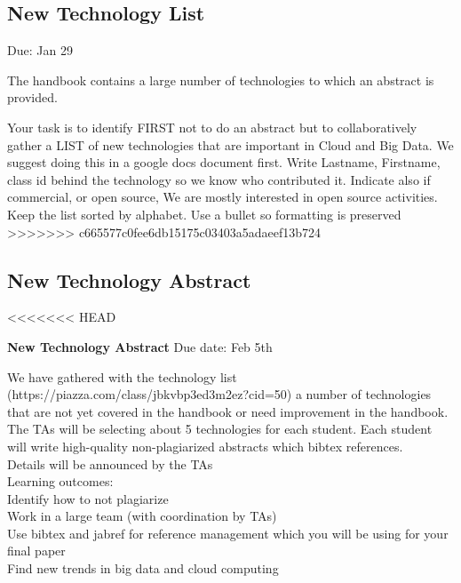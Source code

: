 \subsection{New Technology List}

\begin{exercise} \label{E:new-tech}
Due: Jan 29

The handbook contains a large number of technologies to which an
abstract is provided.

Your task is to identify FIRST not to do an abstract but to
collaboratively gather a LIST of new technologies that are important
in Cloud and Big Data. We suggest doing this in a google docs document
first. Write Lastname, Firstname, class id behind the technology so we
know who contributed it. Indicate also if commercial, or open source,
We are mostly interested in open source activities. Keep the list
sorted by alphabet. Use a bullet so formatting is preserved
>>>>>>> c665577c0fee6db15175c03403a5adaeef13b724

\subsection{New Technology Abstract}

<<<<<<< HEAD
\begin{exercise} \label{a:i524-new-tech-abstracts}
 
{\bf New Technology Abstract} Due date: Feb 5th

We have gathered with the technology list (https://piazza.com/class/jbkvbp3ed3m2ez?cid=50) a number of technologies that are not yet covered in the handbook or need improvement in the handbook.\\

The TAs will be selecting about 5 technologies for each student. Each student will write high-quality non-plagiarized abstracts which bibtex references.\\
 
Details will be announced by the TAs\\
 
Learning outcomes:\\

\noindent Identify how to not plagiarize\\
Work in a large team (with coordination by TAs)\\
Use bibtex and jabref for reference management which you will be using for your final paper\\
Find new trends in big data and cloud computing\\


\end{exercise}
\end{exercise}
